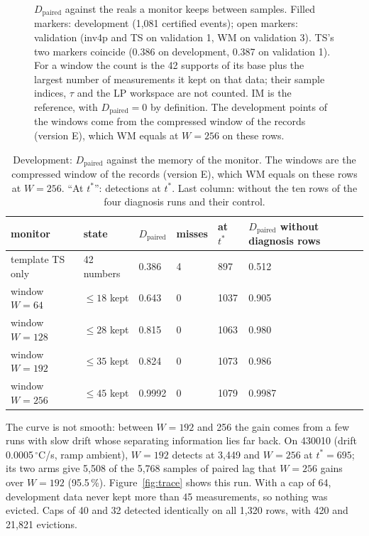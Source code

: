 \documentclass[11pt,a4paper]{article}
\newcommand{\degC}{\ensuremath{{}^\circ}C}
\newcommand{\Dp}{D_{\mathrm{paired}}}
\newcommand{\tstar}{t^{\ast}}
\begin{document}
\begin{figure}[t]
\centering

\caption{$\Dp$ against the reals a monitor keeps between samples. Filled markers: development (1,081 certified
events); open markers: validation (inv4p and TS on validation 1, WM on validation 3). TS's two markers coincide
(0.386 on development, 0.387 on validation 1). For a window the count is the 42
supports of its base plus the largest number of measurements it kept on that data; their sample indices, $\tau$ and
the LP workspace are not counted. IM is the reference, with $\Dp = 0$ by definition. The development points of the windows come from the
compressed window of the records (version E), which WM equals at $W = 256$ on these rows.}
\label{fig:memory}
\end{figure}

\begin{table}[ht]
\centering\small
\caption{Development: $\Dp$ against the memory of the monitor. The windows are the compressed window of the
records (version E), which WM equals on these rows at $W = 256$. ``At $\tstar$'': detections at $\tstar$. Last column: without the ten rows of
the four diagnosis runs and their control.}\label{tab:dev}
\begin{tabular}{llllll}
\toprule
monitor & state & $\Dp$ & misses & at $\tstar$ & $\Dp$ without diagnosis rows\\
\midrule
template TS only & 42 numbers & 0.386 & 4 & 897 & 0.512\\
window $W = 64$ & $\le18$ kept & 0.643 & 0 & 1037 & 0.905\\
window $W = 128$ & $\le28$ kept & 0.815 & 0 & 1063 & 0.980\\
window $W = 192$ & $\le35$ kept & 0.824 & 0 & 1073 & 0.986\\
window $W = 256$ & $\le45$ kept & 0.9992 & 0 & 1079 & 0.9987\\
\bottomrule
\end{tabular}
\end{table}

The curve is not smooth: between $W = 192$ and 256 the gain comes from a few runs with slow drift whose separating
information lies far back. On 430010 (drift 0.0005\,\degC/s, ramp ambient), $W = 192$ detects at 3,449 and $W = 256$ at
$\tstar = 695$; its two arms give 5,508 of the 5,768 samples of paired lag that $W = 256$ gains over $W = 192$
(95.5\,\%). Figure~\ref{fig:trace} shows this run. With a cap of 64, development data never kept more than 45 measurements, so nothing was evicted. Caps of
40 and 32 detected identically on all 1,320 rows, with 420 and 21,821 evictions.
\end{document}
